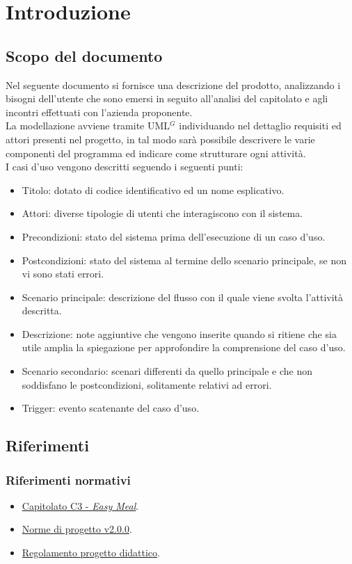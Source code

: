 \section{Introduzione}

\subsection{Scopo del documento}
Nel seguente documento si fornisce una descrizione del prodotto, analizzando i bisogni dell'utente che sono emersi in seguito all'analisi del capitolato e agli incontri effettuati con l'azienda proponente. \\
La modellazione avviene tramite UML$^G$ individuando nel dettaglio requisiti ed attori presenti nel progetto, in tal modo sarà possibile descrivere le varie componenti del programma ed indicare come strutturare ogni attività. \\

\noindent
I casi d'uso vengono descritti seguendo i seguenti punti:
\begin{itemize}
	\item Titolo: dotato di codice identificativo ed un nome esplicativo.
	\item Attori: diverse tipologie di utenti che interagiscono con il sistema.
	\item Precondizioni: stato del sistema prima dell'esecuzione di un caso d'uso.
	\item Postcondizioni: stato del sistema al termine dello scenario principale, se non vi sono stati errori.
	\item Scenario principale: descrizione del flusso con il quale viene svolta l'attività descritta.
	\item Descrizione: note aggiuntive che vengono inserite quando si ritiene che sia utile amplia la spiegazione per approfondire la comprensione del caso d'uso.
	\item Scenario secondario: scenari differenti da quello principale e che non soddisfano le postcondizioni, solitamente relativi ad errori.
	\item Trigger: evento scatenante del caso d'uso.
\end{itemize}

\subsection{Riferimenti}
\subsubsection{Riferimenti normativi}
\begin{itemize}
    \item \href{https://www.math.unipd.it/~tullio/IS-1/2023/Progetto/C3.pdf}{Capitolato C3 - \textit{Easy Meal}}.
    \item \href{https://project-swenergy.github.io/}{Norme di progetto v2.0.0}.
    \item \href{https://www.math.unipd.it/~tullio/IS-1/2023/Dispense/PD2.pdf}{Regolamento progetto didattico}.
\end{itemize}

